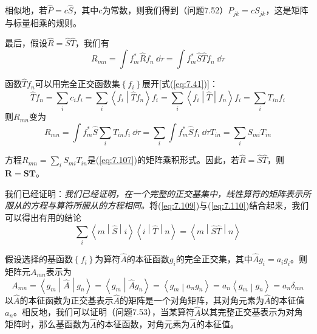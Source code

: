     相似地，若$\hat{P} = c\hat{S}$，其中$c$为常数，则我们得到（问题7.52）$P_{jk} = cS_{jk}$，这是矩阵与标量相乘的规则。

    最后，假设$\hat{R} = \hat{S}\hat{T}$，我们有
    \begin{equation}
        R_{mn} = \int f_m^{\ast}\hat{R}f_n \: \dd \tau = \int f_m^{\ast}\hat{S}\hat{T}f_n \: \dd \tau
        \label{eq:7.109}
    \end{equation}

    函数$\hat{T}f_n$可以用完全正交函数集$\left\{f_i\right\}$展开[式(\ref{eq:7.41})]：
    \begin{equation*}
        \hat{T}f_n = \sum_{i}c_{i}f_i = \sum_{i}\left\langle f_i \middle| \hat{T}f_n \right\rangle f_i = \sum_{i}\left\langle f_i \middle| \hat{T} \middle| f_n \right\rangle f_i = \sum_{i}T_{in}f_i
    \end{equation*}
    则$R_{mn}$变为
    \begin{equation}
        R_{mn} = \int f_m^{\ast}\hat{S}\sum_{i}T_{in}f_i \: \dd \tau = \sum_{i}\int f_m^{\ast}\hat{S}f_i \: \dd \tau T_{in} = \sum_{i}S_{mi}T_{in}
        \label{eq:7.110}
    \end{equation}

    方程$R_{mn} = \sum_{i}S_{mi}T_{in}$是(\ref{eq:7.107})的矩阵乘积形式。因此，若$\hat{R} = \hat{S}\hat{T}$，则$\mathbf{R} = \mathbf{S}\mathbf{T}$。

    我们已经证明：\textit{我们已经证明，在一个完整的正交基集中，线性算符的矩阵表示所服从的方程与算符所服从的方程相同。}将(\ref{eq:7.109})与(\ref{eq:7.110})结合起来，我们可以得出有用的结论
    \begin{equation}
        \sum_i\left\langle m \middle| \hat{S} \middle| i \right\rangle \left\langle i \middle| \hat{T} \middle| n \right\rangle = \left\langle m \middle| \hat{S}\hat{T} \middle| n \right\rangle
        \label{eq:7.111}
    \end{equation}

    假设选择的基函数$\left\{f_i\right\}$为算符$\hat{A}$的本征函数$g_i$的完全正交集，其中$\hat{A}g_i = a_ig_i$。则矩阵元$A_{mn}$表示为
    \begin{equation*}
        A_{mn} = \left\langle g_m \middle| \hat{A} \middle| g_n \right\rangle = \left\langle g_m \middle| \hat{A}g_n \right\rangle = \left\langle g_m \middle| a_ng_n \right\rangle = a_n \left\langle g_m \middle| g_n \right\rangle = a_n\delta_{mn}
    \end{equation*}
    以$\hat{A}$的本征函数为正交基表示$\hat{A}$的矩阵是一个对角矩阵，其对角元素为$\hat{A}$的本征值$a_n$。相反地，我们可以证明（问题7.53），当某算符$\hat{A}$以其完整正交基表示为对角矩阵时，那么基函数为$\hat{A}$的本征函数，对角元素为$\hat{A}$的本征值。

